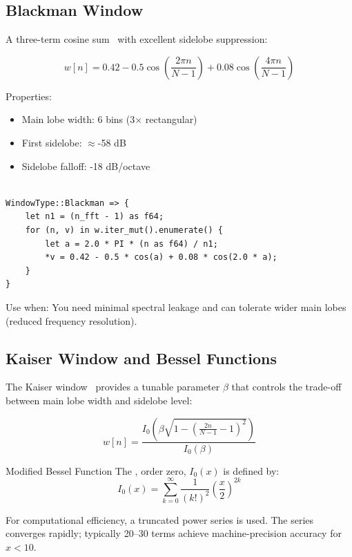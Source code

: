 \subsection{Blackman Window}\label{subsec:blackman_window}

A three-term cosine sum~\cite{blackman1958measurement} with excellent
sidelobe suppression:

\begin{equation}
  \label{eq:blackman_window}
  w[n] = 0.42 - 0.5\cos\left(\frac{2\pi n}{N-1}\right) +
  0.08\cos\left(\frac{4\pi n}{N-1}\right)
\end{equation}

Properties:
\begin{itemize}
  \item Main lobe width: 6 bins (3$\times$ rectangular)
  \item First sidelobe: $\approx$-58 dB
  \item Sidelobe falloff: -18 dB/octave
\end{itemize}

\begin{lstlisting}[caption={Blackman window implementation}]

WindowType::Blackman => {
    let n1 = (n_fft - 1) as f64;
    for (n, v) in w.iter_mut().enumerate() {
        let a = 2.0 * PI * (n as f64) / n1;
        *v = 0.42 - 0.5 * cos(a) + 0.08 * cos(2.0 * a);
    }
}
\end{lstlisting}

Use when: You need minimal spectral leakage and can tolerate wider
main lobes (reduced frequency resolution).

\subsection{Kaiser Window and Bessel Functions}\label{subsec:kaiser_window}

The Kaiser window~\cite{kaiser1974nonrecursive} provides a tunable
parameter $\beta$ that controls the trade-off between main lobe width
and sidelobe level:

\begin{equation}
  \label{eq:kaiser_window}
  w[n] =
  \frac{I_0\left(\beta\sqrt{1-{\left(\frac{2n}{N-1}-1\right)}^{2}}\right)}{I_0(\beta)}
\end{equation}

\begin{concept}{Modified Bessel Function}
  The , order
  zero, $I_0(x)$ is defined by:
  \begin{equation}
    \label{eq:bessel_i0}
    I_0(x) = \sum_{k=0}^{\infty} \frac{1}{(k!)^2}{\left(\frac{x}{2}\right)^{2k}}
  \end{equation}

  For computational efficiency, a truncated power series is used. The
  series converges rapidly; typically 20--30 terms achieve
  machine-precision accuracy for $x < 10$.
\end{concept}

